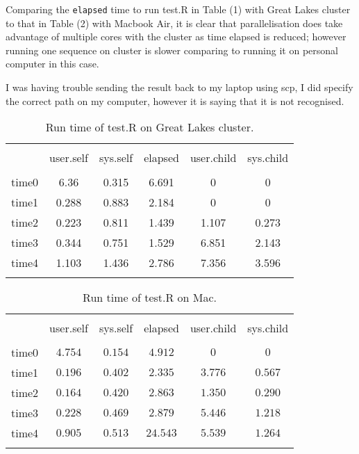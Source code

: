 \documentclass[12pt]{article}
\begin{document}
\begin{enumerate}
Comparing the \verb|elapsed| time to run test.R in Table (1) with Great Lakes cluster to that in Table (2) with Macbook Air, it is clear that parallelisation does take advantage of multiple cores with the cluster as time elapsed is reduced; however running one sequence on cluster is slower comparing to running it on personal computer in this case.

I was having trouble sending the result back to my laptop using scp, I did specify the correct path on my computer, however it is saying that it is not recognised.

\begin{table}[!htbp] \centering
\caption{\footnotesize Run time of test.R on Great Lakes cluster.}
\label{tab:GL}
\begin{tabular}{lccccc}
\\[-1.8ex]\hline 
\hline \\[-1.8ex] 
&user.self & sys.self & elapsed & user.child & sys.child\\
\hline \\[-1.8ex] 
time0 &6.36 &0.315 &6.691 &0 &0\\
time1 &0.288 & 0.883 &2.184 &0 &0\\
time2 &0.223 &0.811 &1.439 &1.107 &0.273\\
time3 &0.344 &0.751 &1.529 &6.851 &2.143\\
time4 &1.103 &1.436 &2.786 &7.356 &3.596\\
\hline \\[-1.8ex] 
\end{tabular}
\end{table}

\begin{table}[!htbp] \centering 
 \caption{\footnotesize Run time of test.R on Mac.}
\label{tab:mac}
\begin{tabular}{lccccc} 
\\[-1.8ex]\hline 
\hline \\[-1.8ex] 
 & user.self & sys.self & elapsed & user.child & sys.child \\ 
\hline \\[-1.8ex] 
time0 & $4.754$ & $0.154$ & $4.912$ & $0$ & $0$ \\ 
time1 & $0.196$ & $0.402$ & $2.335$ & $3.776$ & $0.567$ \\ 
time2 & $0.164$ & $0.420$ & $2.863$ & $1.350$ & $0.290$ \\ 
time3 & $0.228$ & $0.469$ & $2.879$ & $5.446$ & $1.218$ \\ 
time4 & $0.905$ & $0.513$ & $24.543$ & $5.539$ & $1.264$ \\ 
\hline \\[-1.8ex] 
\end{tabular} 
\end{table} 
  
\end{enumerate}
\end{document}
